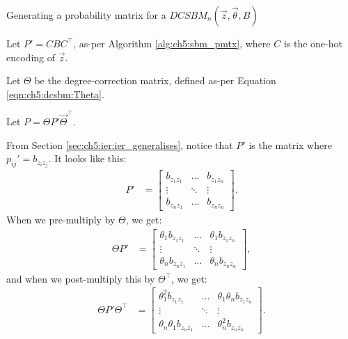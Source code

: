 \begin{algorithm}[h]\caption{Generating a probability matrix for a $DCSBM_n(\vec z, \vec\theta, B)$}
\label{alg:ch5:dcsbm_prob}
\SetAlgoLined
{}

Let $P' = CBC^\top$, as-per Algorithm \ref{alg:ch5:sbm_pmtx}, where $C$ is the one-hot encoding of $\vec z$.

Let $\Theta$ be the degree-correction matrix, defined as-per Equation \ref{eqn:ch5:dcsbm:Theta}.

Let $P = \Theta P' \vec\Theta^\top$. 

\end{algorithm}
From Section \ref{sec:ch5:ier:ier_generalises}, notice that $P'$ is the matrix where $p_{ij}' = b_{z_i z_j}$. It looks like this:
\begin{align*}
    P' &= \begin{bmatrix}
        b_{z_1 z_1} & \hdots & b_{z_1 z_n} \\
        \vdots  &\ddots & \vdots \\
        b_{z_n z_1} & \hdots & b_{z_n z_n}
    \end{bmatrix}.
\end{align*}
When we pre-multiply by $\Theta$, we get:
\begin{align*}
    \Theta P' &= \begin{bmatrix}
        \theta_1 b_{z_1z_1} & \hdots & \theta_1 b_{z_1 z_n} \\
        \vdots & \ddots & \vdots \\
        \theta_n b_{z_nz_1} & \hdots & \theta_n b_{z_n z_n}
    \end{bmatrix},
\end{align*}
and when we post-multiply this by $\Theta^\top$, we get:
\begin{align*}
    \Theta P' \Theta^\top &= \begin{bmatrix}
        \theta_1^2 b_{z_1z_1} & \hdots & \theta_1\theta_n b_{z_1 z_n} \\
        \vdots & \ddots & \vdots \\
        \theta_n \theta_1 b_{z_nz_1} & \hdots & \theta_n^2 b_{z_n z_n}
    \end{bmatrix}.
\end{align*}


